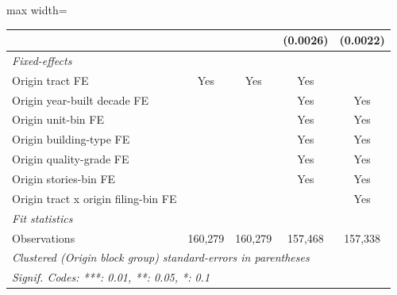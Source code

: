 \documentclass[
  11pt,
]{article}
\begin{document}
\begin{adjustbox}{max width=\textwidth}
\begin{tabular}{lcccc}
                                                  &                &                & (0.0026)       & (0.0022)\\   
   \midrule
   \emph{Fixed-effects}\\
   Origin tract FE                                & Yes            & Yes            & Yes            & \\  
   Origin year-built decade FE                    &                &                & Yes            & Yes\\  
   Origin unit-bin FE                             &                &                & Yes            & Yes\\  
   Origin building-type FE                        &                &                & Yes            & Yes\\  
   Origin quality-grade FE                        &                &                & Yes            & Yes\\  
   Origin stories-bin FE                          &                &                & Yes            & Yes\\  
   Origin tract x origin filing-bin FE            &                &                &                & Yes\\  
   \midrule
   \emph{Fit statistics}\\
   Observations                                   & 160,279        & 160,279        & 157,468        & 157,338\\  
   \midrule \midrule
   \multicolumn{5}{l}{\emph{Clustered (Origin block group) standard-errors in parentheses}}\\
   \multicolumn{5}{l}{\emph{Signif. Codes: ***: 0.01, **: 0.05, *: 0.1}}\\
\end{tabular}
\par\endgroup

\end{adjustbox}
\end{document}
